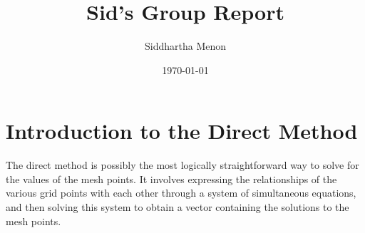 \documentclass[a4paper]{article}
\begin{document}
\title{Sid's Group Report}
\author{Siddhartha Menon}
\date{\today}

\maketitle

\section{Introduction to the Direct Method}
The direct method is possibly the most logically straightforward way to solve
for the values of the mesh points. It involves expressing the relationships of
the various grid points with each other through a system of simultaneous
equations, and then solving this system to obtain a vector containing the
solutions to the mesh points.
\end{document}
